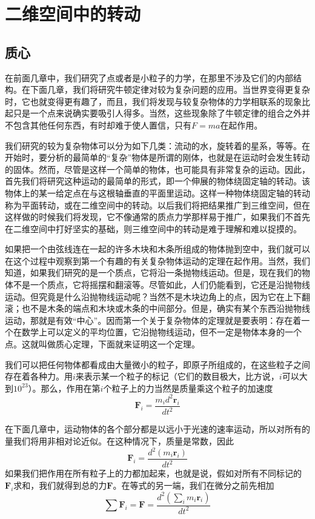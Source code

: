 \chapter{二维空间中的转动}

\section{质心}

在前面几章中，我们研究了点或者是小粒子的力学，在那里不涉及它们的内部结构。在下面几章，我们将研究牛顿定律对较为复杂问题的应用。当世界变得更复杂时，它也就变得更有趣了，而且，我们将发现与较复杂物体的力学相联系的现象比起只是一个点来说确实要吸引人得多。当然，这些现象除了牛顿定律的组合之外并不包含其他任何东西，有时却难于使人置信，只有$F=ma$在起作用。

我们研究的较为复杂物体可以分为如下几类：流动的水，旋转着的星系，等等。在开始时，要分析的最简单的“复杂”物体是所谓的刚体，也就是在运动时会发生转动的固体。然而，尽管是这样一个简单的物体，也可能具有非常复杂的运动。因此，首先我们将研究这种运动的最简单的形式，即一个伸展的物体绕固定轴的转动。该物体上的某一给定点在与这根轴垂直的平面里运动。这样一种物体绕固定轴的转动称为平面转动，或在二维空间中的转动。以后我们将把结果推广到三维空间，但在这样做的时候我们将发现，它不像通常的质点力学那样易于推广，如果我们不首先在二维空间中打好坚实的基础，则三维空间中的转动是难于理解和难以捉摸的。

如果把一个由弦线连在一起的许多木块和木条所组成的物体抛到空中，我们就可以在这个过程中观察到第一个有趣的有关复杂物体运动的定理在起作用。当然，我们知道，如果我们研究的是一个质点，它将沿一条抛物线运动。但是，现在我们的物体不是一个质点，它将摇摆和翻滚等。尽管如此，人们仍能看到，它还是沿抛物线运动。但究竟是什么沿抛物线运动呢？当然不是木块边角上的点，因为它在上下翻滚；也不是木条的端点和木块或木条的中间部分。但是，确实有某个东西沿抛物线运动，那就是有效“中心”。因而第一个关于复杂物体的定理就是要表明：存在着一个在数学上可以定义的平均位置，它沿抛物线运动，但不一定是物体本身的一个点。这就叫做质心定理，下面就来证明这一个定理。

我们可以把任何物体都看成由大量微小的粒子，即原子所组成的，在这些粒子之间存在着各种力。用$i$来表示某一个粒子的标记（它们的数目极大，比方说，$i$可以大到$10^{23}$）。那么，作用在第$i$个粒子上的力当然是质量乘这个粒子的加速度
\begin{equation}
    \label{Eq:I:18:1}
    \boldsymbol{F}_i = \frac{m_id^2\boldsymbol{r}_i}{dt^2}
\end{equation}

在下面几章中，运动物体的各个部分都是以远小于光速的速率运动，所以对所有的量我们将用非相对论近似。在这种情况下，质量是常数，因此
\begin{equation}
    \label{Eq:I:18:2}
    \boldsymbol{F}_i = \frac{d^2(m_i\boldsymbol{r}_i)}{dt^2}
\end{equation}
如果我们把作用在所有粒子上的力都加起来，也就是说，假如对所有不同标记的$\boldsymbol{F}_i$求和，我们就得到总的力$\boldsymbol{F}$。在等式的另一端，我们在微分之前先相加
\begin{equation}
    \label{Eq:I:18:3}
    \sum \boldsymbol{F}_i = \boldsymbol{F} = \frac{d^2(\sum\limits_{i} m_i\boldsymbol{r}_i)}{dt^2}
\end{equation}

